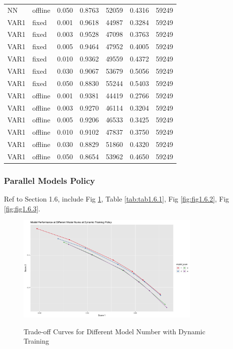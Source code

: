 \documentclass{article}
\begin{document}
\begin{longtable}[htbp]{l|l|l|*{4}{c}}
    NN & offline & 0.050 & 0.8763 & 52059 & 0.4316 & 59249\\
    VAR1 & fixed & 0.001 & 0.9618 & 44987 & 0.3284 & 59249\\
    VAR1 & fixed & 0.003 & 0.9528 & 47098 & 0.3763 & 59249\\
    VAR1 & fixed & 0.005 & 0.9464 & 47952 & 0.4005 & 59249\\
    VAR1 & fixed & 0.010 & 0.9362 & 49559 & 0.4372 & 59249\\
    VAR1 & fixed & 0.030 & 0.9067 & 53679 & 0.5056 & 59249\\
    VAR1 & fixed & 0.050 & 0.8830 & 55244 & 0.5403 & 59249\\
    VAR1 & offline & 0.001 & 0.9381 & 44419 & 0.2766 & 59249\\
    VAR1 & offline & 0.003 & 0.9270 & 46114 & 0.3204 & 59249\\
    VAR1 & offline & 0.005 & 0.9206 & 46533 & 0.3425 & 59249\\
    VAR1 & offline & 0.010 & 0.9102 & 47837 & 0.3750 & 59249\\
    VAR1 & offline & 0.030 & 0.8829 & 51860 & 0.4320 & 59249\\
    VAR1 & offline & 0.050 & 0.8654 & 53962 & 0.4650 & 59249\\
\end{longtable}

\subsubsection{Parallel Models Policy}
Ref to Section 1.6, include Fig \ref{fig:fig1.6.1}, Table \ref{tab:tab1.6.1},
Fig \ref{fig:fig1.6.2}, Fig \ref{fig:fig1.6.3}.

\begin{figure}
    \caption{Trade-off Curves for Different Model Number with Dynamic Training}
    \centering
    \includegraphics[width = 0.8\textwidth]{images/ModelPerformanceatDifferentModelNumsatDynamicTrainingPolicy.png}
    \label{fig:fig1.6.1}
\end{figure}
\end{document}
